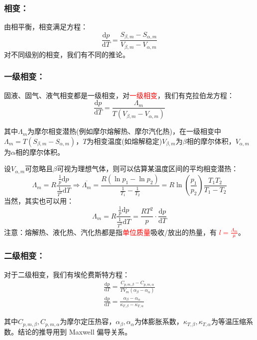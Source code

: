 \documentclass[zihao=-4,UTF8]{report}
\begin{document}
\subsubsection{相变：}
由相平衡，相变满足方程：
\begin{equation}
    \frac{\mathrm{d}p}{\mathrm{d}T} = \frac{S_{\beta,m} - S_{\alpha,m}}{V_{\beta,m}-V_{\alpha,m}}
\end{equation}
对不同级别的相变，我们有不同的推论。
\subsubsection{一级相变：}
固液、固气、液气相变都是一级相变，对\textcolor{red}{一级相变}，我们有克拉伯龙方程：
\begin{equation}
    \frac{\mathrm{d} p}{\mathrm{d}T} = \frac{\Lambda_m}{T(V_{\beta,m}-V_{\alpha,m})}
\end{equation}
{\par\color{gray}\small
其中$\Lambda_m$为摩尔相变潜热(例如摩尔熔解热、摩尔汽化热)，在一级相变中$\Lambda_m = T(S_{\beta,m} - S_{\alpha,m})$，$T$为相变温度(如熔解稳定)$V_{\beta,m}$为$\beta$相的摩尔体积，$V_{\alpha,m}$为$\alpha$相的摩尔体积。\par
设$V_{\alpha,m}$可忽略且$\beta$可视为理想气体，则可以估算某温度区间的平均相变潜热：
\begin{equation*}
    \Lambda_m = R\frac{\frac{1}{p}\mathrm{d}p}{\frac{1}{T^2}\mathrm{d}T}\Longrightarrow \overline{\Lambda_m} = \frac{R(\ln p_1 - \ln p_2)}{\frac{1}{T_1} - \frac{1}{T_2}} =  R\ln(\frac{p_1}{p_2})\frac{T_1T_2}{T_1 - T_2}
\end{equation*}
当然，其实也可以用：
\begin{equation*}
    \Lambda_m = R\frac{\frac{1}{p}\mathrm{d}p}{\frac{1}{T^2}\mathrm{d}T} = \frac{RT^2}{p}\cdot \frac{\mathrm{d}p}{\mathrm{d}T}
\end{equation*}
注意：熔解热、液化热、汽化热都是指\textcolor{red}{单位质量}吸收/放出的热量，有 \textcolor{red}{ $l = \frac{\Lambda_m}{\mu}$}。
\par}

\subsubsection{二级相变：}
对于二级相变，我们有埃伦费斯特方程：
\begin{gather}
    \frac{\mathrm{d} p}{\mathrm{d}T} = \frac{C_{p,m,\beta} - C_{p,m,\alpha}}{TV_m(\alpha_\beta - \alpha_\alpha)}\\
    \frac{\mathrm{d} p}{\mathrm{d}T} = \frac{\alpha_\beta - \alpha_\alpha}{\kappa_{T,\beta} - \kappa_{T,\alpha}}
\end{gather}
{\par\color{gray}\small
其中$C_{p,m,\beta}, C_{p,m,\alpha}$为摩尔定压热容，$\alpha_\beta, \alpha_\alpha$为体膨胀系数，$\kappa_{T,\beta}, \kappa_{T,\alpha}$为等温压缩系数。结论的推导用到 Maxwell 偏导关系。
\par}
\end{document}
